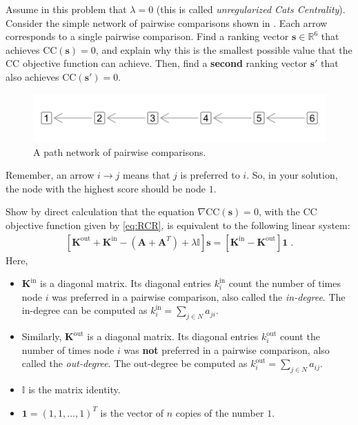 \documentclass{hw}
\begin{document}

Assume in this problem that $\lambda = 0$ (this is called \emph{unregularized Cats Centrality}). Consider the simple network of pairwise comparisons shown in . 
Each arrow corresponds to a single pairwise comparison. 
Find a ranking vector $\mathbf{s}\in \mathbb{R}^6$ that achieves $\mathrm{CC}(\mathbf{s}) = 0$, and explain why this is the smallest possible value that the CC objective function can achieve.  
Then, find a \textbf{second} ranking vector $\mathbf{s}'$ that also achieves $\mathrm{CC}(\mathbf{s}') = 0$. 

\begin{figure}[h]
    \includegraphics[width=\textwidth]{img/path.png}
    \caption{A path network of pairwise comparisons.}\label{fig:path}
\end{figure}

\begin{hint}
    Remember, an arrow $i \rightarrow j$ means that $j$ is preferred to $i$. 
    So, in your solution, the node with the highest score should be node $1$. 
\end{hint}


Show by direct calculation that the equation $\nabla \mathrm{CC}(\mathbf{s}) = 0$, with the $\mathrm{CC}$ objective function given by \eqref{eq:RCR}, is equivalent to the following linear system: 
\begin{align}
    \left[\mathbf{K}^\mathrm{out} + \mathbf{K}^{\mathrm{in}} - (\mathbf{A} + \mathbf{A}^T) + \lambda \mathbb{I}\right]\mathbf{s} = [\mathbf{K}^{\mathrm{in}} - \mathbf{K}^\mathrm{out}]\mathbf{1}\;.  \label{eq:linear-system}
\end{align}
Here, 
\begin{itemize}
    \item $\mathbf{K}^{\mathrm{in}}$ is a diagonal matrix. 
    Its diagonal entries $k_i^{\mathrm{in}}$ count the number of times node $i$ was preferred in a pairwise comparison, also called the \emph{in-degree}. 
    The in-degree can be computed as $k_i^{\mathrm{in}} = \sum_{j \in N}a_{ji}$. 
    \item Similarly, $\mathbf{K}^{\mathrm{out}}$ is a diagonal matrix. 
    Its diagonal entries $k_i^{\mathrm{out}}$ count the number of times node $i$ was \textbf{not} preferred in a pairwise comparison, also called the \emph{out-degree}. 
    The out-degree be computed as $k_i^{\mathrm{out}} = \sum_{j \in N}a_{ij}$. 
    \item $\mathbb{I}$ is the matrix identity. 
    \item $\mathbf{1} = (1,1,\ldots,1)^T$ is the vector of $n$ copies of the number $1$. 
\end{itemize}
\end{document}
